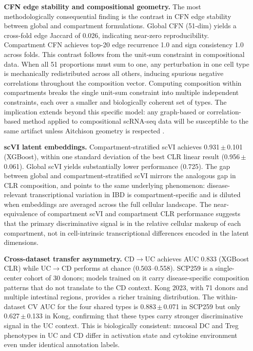 \documentclass[11pt,letterpaper]{article}
\begin{document}
\textbf{CFN edge stability and compositional geometry.}
The most methodologically consequential finding is the contrast in CFN edge
stability between global and compartment formulations. Global CFN (51-dim)
yields a cross-fold edge Jaccard of 0.026, indicating near-zero reproducibility.
Compartment CFN achieves top-20 edge recurrence 1.0 and sign consistency 1.0
across folds. This contrast follows from the unit-sum constraint in compositional
data. When all 51 proportions must sum to one, any perturbation in one cell
type is mechanically redistributed across all others, inducing spurious
negative correlations throughout the composition vector. Computing composition
within compartments breaks the single unit-sum constraint into multiple
independent constraints, each over a smaller and biologically coherent set of
types. The implication extends beyond this specific model: any
graph-based or correlation-based method applied to compositional scRNA-seq data
will be susceptible to the same artifact unless Aitchison geometry is respected
\citep{aitchison1982statistical}.

\textbf{scVI latent embeddings.}
Compartment-stratified scVI achieves 0.931\,$\pm$\,0.101 (XGBoost), within one
standard deviation of the best CLR linear result (0.956\,$\pm$\,0.061). Global
scVI yields substantially lower performance (0.725). The gap between global and
compartment-stratified scVI mirrors the analogous gap in CLR composition, and
points to the same underlying phenomenon: disease-relevant transcriptional
variation in IBD is compartment-specific and is diluted when embeddings are
averaged across the full cellular landscape. The near-equivalence of
compartment scVI and compartment CLR performance suggests that the primary
discriminative signal is in the relative cellular makeup of each compartment,
not in cell-intrinsic transcriptional differences encoded in the latent
dimensions.

\textbf{Cross-dataset transfer asymmetry.}
CD$\rightarrow$UC achieves AUC 0.833 (XGBoost CLR) while UC$\rightarrow$CD
performs at chance (0.503--0.558). SCP259 is a single-center cohort of 30
donors; models trained on it carry disease-specific composition patterns that
do not translate to the CD context. Kong 2023, with 71 donors and multiple
intestinal regions, provides a richer training distribution. The
within-dataset CV AUC for the four shared types is 0.883\,$\pm$\,0.071 in
SCP259 but only 0.627\,$\pm$\,0.133 in Kong, confirming that these types carry
stronger discriminative signal in the UC context. This is biologically
consistent: mucosal DC and Treg phenotypes in UC and CD differ in activation
state and cytokine environment even under identical annotation labels.
\end{document}
